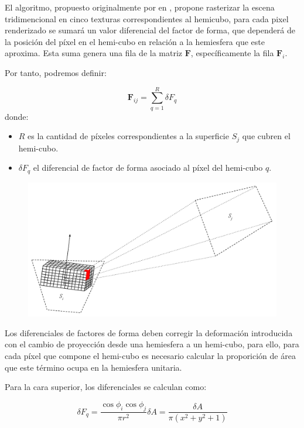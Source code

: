 El algoritmo, propuesto originalmente por \citeauthor{Cohen} en \citeyear{Cohen}, propone rasterizar la escena tridimencional en cinco texturas correspondientes al hemicubo, para cada pixel renderizado se sumará un valor diferencial del factor de forma, que dependerá de la posición del píxel en el hemi-cubo en relación a la hemiesfera que este aproxima. Esta suma genera una fila de la matriz $\mathbf{F}$, específicamente la fila $\mathbf{F}_{i}$.

Por tanto, podremos definir:

\begin{equation}
	\mathbf{F}_{ij} = \sum_{q=1}^{R} \delta{F_{q}}
	\label{eq:ffgreenberg}
\end{equation}
donde:
\begin{itemize}
	\item $R$ es la cantidad de píxeles correspondientes a la superficie $S_{j}$ que cubren el hemi-cubo.
	\item $\delta{F_{q}}$ el diferencial de factor de forma asociado al píxel del hemi-cubo $q$.
\end{itemize}

\vspace{5mm}
\begin{figure}[H]
	\centering
	\includegraphics[width=0.8\linewidth]{assets/Hemicube}
	\label{img:ff}
\end{figure}

Los diferenciales de factores de forma deben corregir la deformación introducida con el cambio de proyección desde una hemiesfera a un hemi-cubo, para ello, para cada píxel que compone el hemi-cubo es necesario calcular la proporición de área que este término ocupa en la hemiesfera unitaria.

Para la cara superior, los diferenciales se calculan como:

\begin{equation}
	\delta{F_{q}} = \frac{\cos{\phi_{i}}\cos{\phi_{j}}}{\pi{r^{2}}} \delta{A} = \frac{\delta{A}}{\pi({x^{2} + y^{2} + 1})} 
\end{equation}

